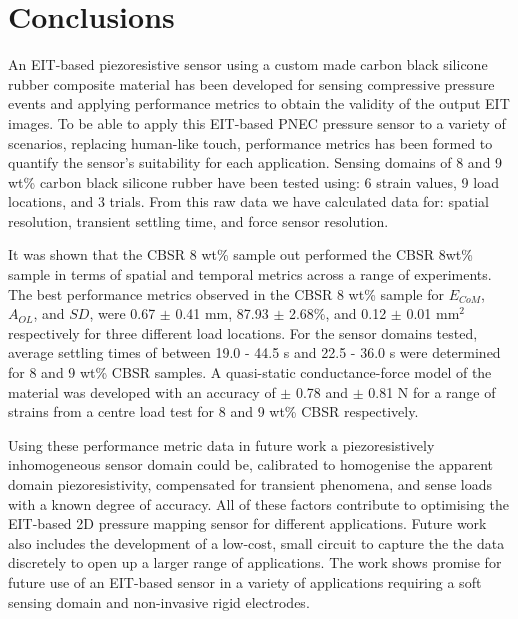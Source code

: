 \section{Conclusions}\label{sec:Summary and Conclusions}


An EIT-based piezoresistive sensor using a custom made carbon black silicone rubber composite material has been developed for sensing compressive pressure events and applying performance metrics to obtain the validity of the output EIT images. To be able to apply this EIT-based PNEC pressure sensor to a variety of scenarios, replacing human-like touch, performance metrics has been formed to quantify the sensor's suitability for each application. Sensing domains of 8 and 9 wt\% carbon black silicone rubber have been tested using: 6 strain values, 9 load locations, and 3 trials. From this raw data we have calculated data for: spatial resolution, transient settling time, and force sensor resolution. 

It was shown that the CBSR 8 wt\% sample out performed the CBSR 8wt\% sample in terms of spatial and temporal metrics across a range of experiments. The best performance metrics observed in the CBSR 8 wt\% sample for $E_{CoM}$, $A_{OL}$, and $S\!D$, were 0.67 $\pm$ 0.41 mm, 87.93 $\pm$ 2.68\%, and 0.12 $\pm$ 0.01 mm$^2$ respectively for three different load locations. For the sensor domains tested, average settling times of between 19.0 - 44.5 s and 22.5 - 36.0 s were determined for 8 and 9 wt\% CBSR samples. A quasi-static conductance-force model of the material was developed with an accuracy of  $\pm$ 0.78 and  $\pm$ 0.81 N for a range of strains from a centre load test for 8 and 9 wt\% CBSR respectively.

Using these performance metric data in future work a piezoresistively inhomogeneous sensor domain could be, calibrated to homogenise the apparent domain piezoresistivity, compensated for transient phenomena, and sense loads with a known degree of accuracy. All of these factors contribute to optimising the EIT-based 2D pressure mapping sensor for different applications. Future work also includes the development of a low-cost, small circuit to capture the the data discretely to open up a larger range of applications. The work shows promise for future use of an EIT-based sensor in a variety of applications requiring a soft sensing domain and non-invasive rigid electrodes. 